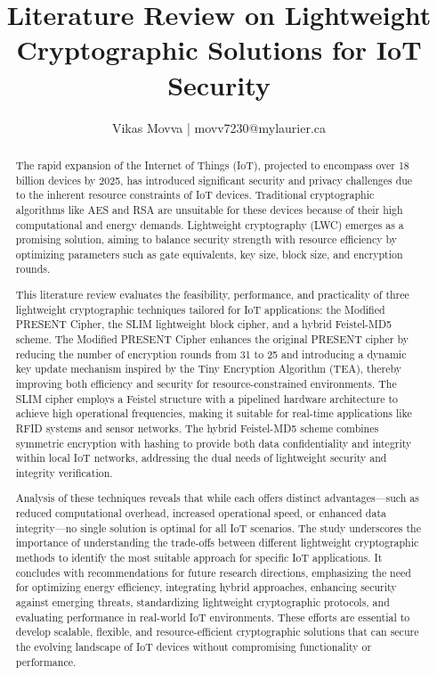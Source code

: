 \documentclass{article}
\title{Literature Review on Lightweight Cryptographic Solutions for IoT Security}
\author{Vikas Movva | movv7230@mylaurier.ca}
\date{}
\begin{document}
\maketitle

\begin{abstract}
The rapid expansion of the Internet of Things (IoT), projected to encompass over 18 billion devices by 2025, has introduced significant security and privacy challenges due to the inherent resource constraints of IoT devices. Traditional cryptographic algorithms like AES and RSA are unsuitable for these devices because of their high computational and energy demands. Lightweight cryptography (LWC) emerges as a promising solution, aiming to balance security strength with resource efficiency by optimizing parameters such as gate equivalents, key size, block size, and encryption rounds.

This literature review evaluates the feasibility, performance, and practicality of three lightweight cryptographic techniques tailored for IoT applications: the Modified PRESENT Cipher, the SLIM lightweight block cipher, and a hybrid Feistel-MD5 scheme. The Modified PRESENT Cipher enhances the original PRESENT cipher by reducing the number of encryption rounds from 31 to 25 and introducing a dynamic key update mechanism inspired by the Tiny Encryption Algorithm (TEA), thereby improving both efficiency and security for resource-constrained environments. The SLIM cipher employs a Feistel structure with a pipelined hardware architecture to achieve high operational frequencies, making it suitable for real-time applications like RFID systems and sensor networks. The hybrid Feistel-MD5 scheme combines symmetric encryption with hashing to provide both data confidentiality and integrity within local IoT networks, addressing the dual needs of lightweight security and integrity verification.

Analysis of these techniques reveals that while each offers distinct advantages—such as reduced computational overhead, increased operational speed, or enhanced data integrity—no single solution is optimal for all IoT scenarios. The study underscores the importance of understanding the trade-offs between different lightweight cryptographic methods to identify the most suitable approach for specific IoT applications. It concludes with recommendations for future research directions, emphasizing the need for optimizing energy efficiency, integrating hybrid approaches, enhancing security against emerging threats, standardizing lightweight cryptographic protocols, and evaluating performance in real-world IoT environments. These efforts are essential to develop scalable, flexible, and resource-efficient cryptographic solutions that can secure the evolving landscape of IoT devices without compromising functionality or performance.
\end{abstract}
\end{document}
